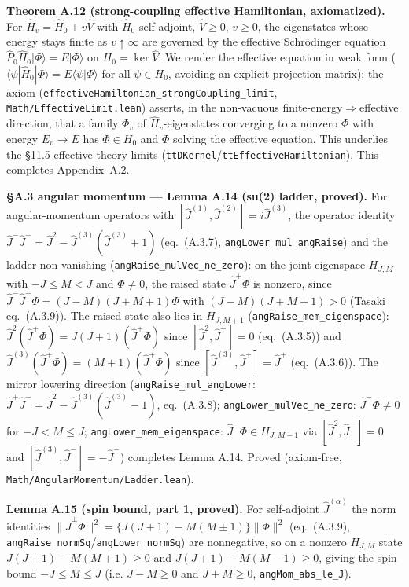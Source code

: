 \documentclass[a4paper,11pt]{article}
\begin{document}
\medskip\noindent\textbf{Theorem A.12 (strong-coupling effective Hamiltonian, axiomatized).}
For $\hat H_v=\hat H_0+v\hat V$ with $\hat H_0$ self-adjoint, $\hat V\ge0$, $v\ge0$, the
eigenstates whose energy stays finite as $v\uparrow\infty$ are governed by the effective
Schr\"odinger equation $\hat P_0\hat H_0|\Phi\rangle=E|\Phi\rangle$ on $H_0=\ker\hat V$.  We render the
effective equation in weak form ($\langle\psi|\hat H_0|\Phi\rangle=E\langle\psi|\Phi\rangle$ for all
$\psi\in H_0$, avoiding an explicit projection matrix); the axiom
(\texttt{effectiveHamiltonian\_strongCoupling\_limit}, \texttt{Math/EffectiveLimit.lean})
asserts, in the non-vacuous finite-energy${}\Rightarrow{}$effective direction, that a family
$\Phi_v$ of $\hat H_v$-eigenstates converging to a nonzero $\Phi$ with energy $E_v\to E$ has
$\Phi\in H_0$ and $\Phi$ solving the effective equation.  This underlies the §11.5 effective-theory limits
(\texttt{ttDKernel}/\texttt{ttEffectiveHamiltonian}).  This completes Appendix~A.2.

\medskip\noindent\textbf{§A.3 angular momentum --- Lemma A.14 (su(2) ladder, proved).}  For
angular-momentum operators with $[\hat J^{(1)},\hat J^{(2)}]=i\hat J^{(3)}$, the operator identity
$\hat J^-\hat J^+=\hat J^2-\hat J^{(3)}(\hat J^{(3)}+1)$ (eq.~(A.3.7), \texttt{angLower\_mul\_angRaise})
and the ladder non-vanishing (\texttt{angRaise\_mulVec\_ne\_zero}): on the joint eigenspace
$H_{J,M}$ with $-J\le M<J$ and $\Phi\ne0$, the raised state $\hat J^+\Phi$ is nonzero, since
$\hat J^-\hat J^+\Phi=(J-M)(J+M+1)\Phi$ with $(J-M)(J+M+1)>0$ (Tasaki eq.~(A.3.9)).  The raised state also lies in $H_{J,M+1}$
(\texttt{angRaise\_mem\_eigenspace}): $\hat J^2(\hat J^+\Phi)=J(J+1)(\hat J^+\Phi)$ since
$[\hat J^2,\hat J^+]=0$ (eq.~(A.3.5)) and $\hat J^{(3)}(\hat J^+\Phi)=(M+1)(\hat J^+\Phi)$ since
$[\hat J^{(3)},\hat J^+]=\hat J^+$ (eq.~(A.3.6)).  The mirror lowering direction
(\texttt{angRaise\_mul\_angLower}: $\hat J^+\hat J^-=\hat J^2-\hat J^{(3)}(\hat J^{(3)}-1)$, eq.~(A.3.8);
\texttt{angLower\_mulVec\_ne\_zero}: $\hat J^-\Phi\ne0$ for $-J<M\le J$; \texttt{angLower\_mem\_eigenspace}:
$\hat J^-\Phi\in H_{J,M-1}$ via $[\hat J^2,\hat J^-]=0$ and $[\hat J^{(3)},\hat J^-]=-\hat J^-$) completes
Lemma A.14.  Proved (axiom-free, \texttt{Math/AngularMomentum/Ladder.lean}).

\medskip\noindent\textbf{Lemma A.15 (spin bound, part 1, proved).}  For self-adjoint
$\hat J^{(\alpha)}$ the norm identities $\|\hat J^\pm\Phi\|^2=\{J(J+1)-M(M\pm1)\}\|\Phi\|^2$
(eq.~(A.3.9), \texttt{angRaise\_normSq}/\texttt{angLower\_normSq}) are nonnegative, so on a nonzero
$H_{J,M}$ state $J(J+1)-M(M+1)\ge0$ and $J(J+1)-M(M-1)\ge0$, giving the spin bound
$-J\le M\le J$ (i.e. $J-M\ge0$ and $J+M\ge0$, \texttt{angMom\_abs\_le\_J}).
\end{document}
